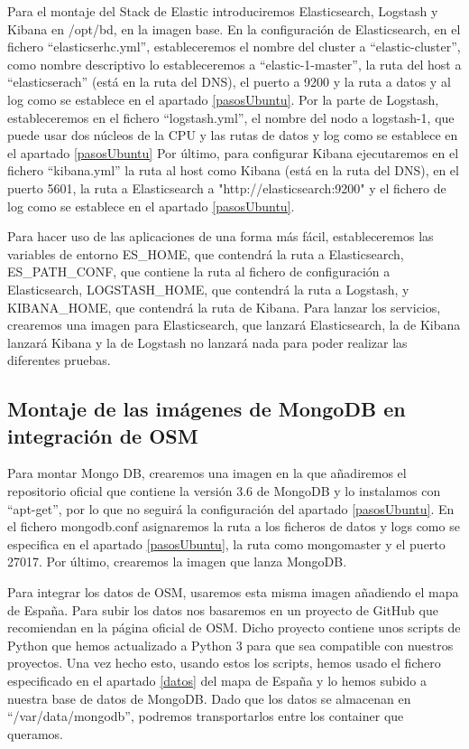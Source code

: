 Para el montaje del Stack de Elastic introduciremos Elasticsearch, Logstash y Kibana en /opt/bd, en la imagen base. En la configuración de Elasticsearch, en el fichero “elasticserhc.yml”, estableceremos el nombre del cluster a “elastic-cluster”, como nombre descriptivo lo estableceremos a “elastic-1-master”, la ruta del host a “elasticserach” (está en la ruta del DNS), el puerto a 9200 y la ruta a datos y al log como se establece en el apartado \ref{pasosUbuntu}. Por la parte de Logstash, estableceremos en el fichero “logstash.yml”, el nombre del nodo a logstash-1, que puede usar dos núcleos de la CPU y las rutas de datos y log como se establece en el apartado \ref{pasosUbuntu} Por último, para configurar Kibana ejecutaremos en el fichero “kibana.yml” la ruta al host como Kibana (está en la ruta del DNS), en el puerto 5601, la ruta a Elasticsearch a "http://elasticsearch:9200" y el fichero de log como se establece en el apartado \ref{pasosUbuntu}.

Para hacer uso de las aplicaciones de una forma más fácil, estableceremos las variables de entorno ES\_HOME, que contendrá la ruta a Elasticsearch, ES\_PATH\_CONF, que contiene la ruta al fichero de configuración a Elasticsearch, LOGSTASH\_HOME, que contendrá la ruta a Logstash, y KIBANA\_HOME, que contendrá la ruta de Kibana.
Para lanzar los servicios, crearemos una imagen para Elasticsearch, que lanzará Elasticsearch, la de Kibana lanzará Kibana y la de Logstash no lanzará nada para poder realizar las diferentes pruebas.

\subsection {Montaje de las imágenes de MongoDB en integración de OSM\label{montMongo}}
Para montar Mongo DB, crearemos una imagen en la que añadiremos el repositorio oficial que contiene la versión 3.6 de MongoDB y lo instalamos con “apt-get”, por lo que no seguirá la configuración del apartado \ref{pasosUbuntu}. En el fichero mongodb.conf asignaremos la ruta a los ficheros de datos y logs como se especifica en el apartado \ref{pasosUbuntu}, la ruta como mongomaster y el puerto 27017. Por último, crearemos la imagen que lanza MongoDB.

Para integrar los datos de OSM, usaremos esta misma imagen añadiendo el mapa de España. Para subir los datos nos basaremos en un proyecto de GitHub que recomiendan en la página oficial de OSM. Dicho proyecto contiene unos scripts de Python que hemos actualizado a Python 3 para que sea compatible con nuestros proyectos. Una vez hecho esto, usando estos los scripts, hemos usado el fichero especificado en el apartado \ref{datos} del mapa de España y lo hemos subido a nuestra base de datos de MongoDB. Dado que los datos se almacenan en “/var/data/mongodb”, podremos transportarlos entre los container que queramos.

